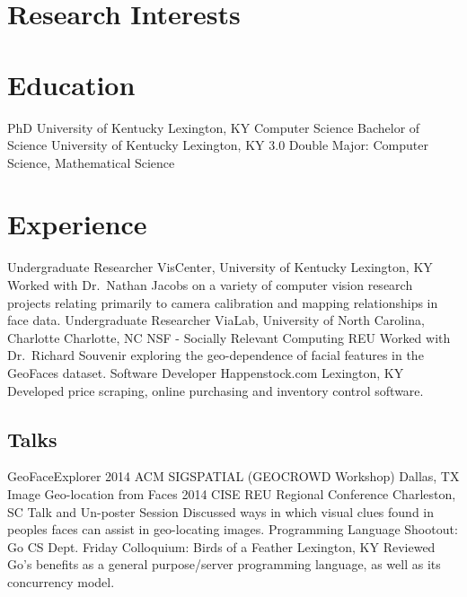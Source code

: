 \documentclass[10pt]{moderncv}
\begin{document}
\makecvtitle

\section{Research Interests}

\section{Education}
  {PhD}
  {University of Kentucky}
  {Lexington, KY}
  {}
  {Computer Science}
  {Bachelor of Science}
  {University of Kentucky}
  {Lexington, KY}
  {3.0}
  {Double Major: Computer Science, Mathematical Science}

\section{Experience}
  {Undergraduate Researcher}
  {VisCenter, University of Kentucky}
  {Lexington, KY}
  {}
  {Worked with Dr.~Nathan Jacobs on a variety of computer vision
   research projects relating primarily to camera calibration and mapping
   relationships in face data.}
  {Undergraduate Researcher}
  {ViaLab, University of North Carolina, Charlotte}
  {Charlotte, NC}
  {NSF - Socially Relevant Computing REU}
  {Worked with Dr.~Richard Souvenir exploring the geo-dependence of facial features in the GeoFaces dataset.}
  {Software Developer}
  {Happenstock.com}
  {Lexington, KY}
  {}
  {Developed price scraping, online purchasing and inventory control software.}

\nocite{*}
\printbibliography[title={Publications}]

\subsection{Talks}
  {GeoFaceExplorer}
  {2014 ACM SIGSPATIAL (GEOCROWD Workshop)}
  {Dallas, TX}
  {}
  {}
  {Image Geo-location from Faces}
  {2014 CISE REU Regional Conference}
  {Charleston, SC}
  {Talk and Un-poster Session}
  {Discussed ways in which visual clues found in peoples faces can assist in geo-locating images.}
  {Programming Language Shootout: Go}
  {CS Dept. Friday Colloquium: Birds of a Feather}
  {Lexington, KY}
  {}
  {Reviewed Go's benefits as a general purpose/server programming language, as well as its concurrency model.}
\end{document}
